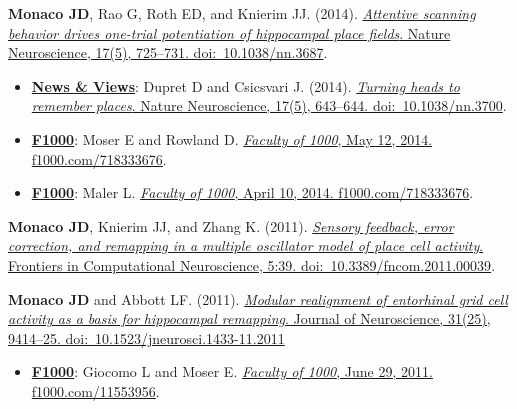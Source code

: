 \documentclass[10pt]{article}
\begin{document}
\begin{description}
\item \textbf{Monaco JD}, Rao G, Roth ED, and Knierim JJ. (2014). \href{http://dx.doi.org/10.1038/nn.3687}{\emph{Attentive scanning behavior drives one-trial potentiation of hippocampal place fields}. Nature Neuroscience, 17(5), 725--731. doi:~10.1038/nn.3687}.
\begin{itemize}
  \item \underline{\bf News \& Views}: Dupret D and Csicsvari J. (2014). \href{http://dx.doi.org/10.1038/nn.3700}{\emph{Turning heads to remember places}. Nature Neuroscience, 17(5), 643--644. doi:~10.1038/nn.3700}.
    \item \underline{\bf F1000}: Moser E and Rowland D. \href{http://f1000prime.com/718333676#eval793494783}{\emph{Faculty of 1000}, May 12, 2014. f1000.com/718333676}.
    \item \underline{\bf F1000}: Maler L. \href{http://f1000prime.com/718333676#eval793493493}{\emph{Faculty of 1000}, April 10, 2014. f1000.com/718333676}.
\end{itemize}
\item \textbf{Monaco JD}, Knierim JJ, and Zhang K. (2011). \href{http://dx.doi.org/10.3389/fncom.2011.00039}{\emph{Sensory feedback, error correction, and remapping in a multiple oscillator model of place cell activity}. Frontiers in Computational Neuroscience, 5:39. doi:~10.3389/fncom.2011.00039}.
\item \textbf{Monaco JD} and Abbott LF. (2011). \href{http://dx.doi.org/10.1523/JNEUROSCI.1433-11.2011}{\emph{Modular realignment of entorhinal grid cell activity as a basis for hippocampal remapping}. Journal of Neuroscience, 31(25), 9414--25. doi:~10.1523/jneurosci.1433-11.2011}
\begin{itemize}
    \item \underline{\bf F1000}: Giocomo L and Moser E. \href{http://f1000.com/11553956}{\emph{Faculty of 1000}, June 29, 2011. f1000.com/11553956}.
\end{itemize}
\end{description}
\end{document}
